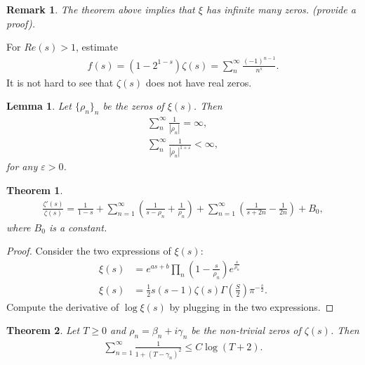 \documentclass[a4paper,10pt]{amsart}
\newtheorem{theorem}{Theorem}[section]
\newtheorem{lemma}{Lemma}[section]
\newtheorem{remark}{Remark}[section]
\begin{document}
\begin{remark}
   The theorem above implies that $\xi$ has infinite many zeros. 
   (provide a proof).
\end{remark}

For $Re(s) > 1$, estimate  
\begin{align*}
    f(s) = (1-2^{1-s})\zeta(s) = \sum_{n}^{\infty}\frac{(-1)^{n-1}}{n^{s}}. 
\end{align*}
It is not hard to see that $\zeta(s)$ does not have real zeros.

\begin{lemma}
    Let $\{\rho_n\}_{n}$ be the zeros of $\xi(s)$. Then
    \begin{align*}
        \sum^{\infty}_{n} \frac{1}{|\rho_n|} = \infty, \\ 
        \sum^{\infty}_{n} \frac{1}{|\rho_n|^{1+\varepsilon}} < \infty, 
    \end{align*}
    for any $\varepsilon > 0$.
\end{lemma}

\begin{theorem}
   \begin{align*}
       \frac{\zeta'(s)}{\zeta(s)} = \frac{1}{1-s} + 
       \sum^{\infty}_{n=1}(\frac{1}{s-\rho_n} + \frac{1}{\rho_n})
       + \sum^{\infty}_{n=1}(\frac{1}{s+2n} - \frac{1}{2n}) + B_{0},
   \end{align*} 
   where $B_0$ is a constant.
\end{theorem}

\begin{proof}
    Consider the two expressions of $\xi(s)$:
    \begin{align*}
        \xi(s) &= 
        e^{as+b}\prod_{n}(1-\frac{s}{\rho_n})e^{\frac{s}{\rho_n}}\\
        \xi(s) &= \frac{1}{2}
    s(s-1)\zeta(s)\Gamma(\frac{S}{2})\pi^{-\frac{s}{2}}.  
    \end{align*}
    Compute the derivative of $\log \xi(s)$ 
    by plugging in the two expressions.
\end{proof}

\begin{theorem}
   Let $T \geq 0$ and $\rho_n = \beta_n + i \gamma_n$ be the non-trivial 
   zeros of $\zeta(s)$. Then
   \begin{align*}
       \sum^{\infty}_{n=1} \frac{1}{1 + (T-\gamma_n)^2} \leq C \log(T+2). 
   \end{align*}
\end{theorem}
\end{document}
